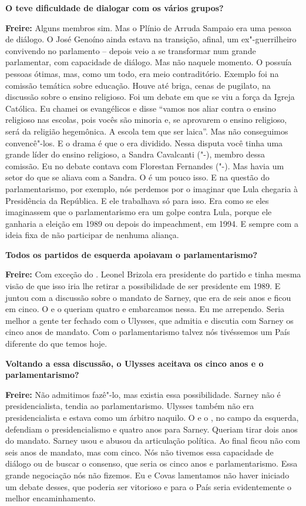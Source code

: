\textbf{O  teve dificuldade de dialogar com os vários grupos?}

\textbf{Freire:} Alguns membros sim. Mas o Plínio de Arruda Sampaio era
uma pessoa de diálogo. O José Genoíno ainda estava na transição, afinal,
um ex"-guerrilheiro convivendo no parlamento -- depois veio a se
transformar num grande parlamentar, com capacidade de diálogo. Mas não
naquele momento. O  possuía pessoas ótimas, mas, como um todo, era
meio contraditório. Exemplo foi na comissão temática sobre educação.
Houve até briga, cenas de pugilato, na discussão sobre o ensino
religioso. Foi um debate em que se viu a força da Igreja Católica. Eu
chamei os evangélicos e disse ``vamos nos aliar contra o ensino
religioso nas escolas, pois vocês são minoria e, se aprovarem o ensino
religioso, será da religião hegemônica. A escola tem que ser laica''.
Mas não conseguimos convencê"-los. E o drama é que o  era dividido.
Nessa disputa você tinha uma grande líder do ensino religioso, a Sandra
Cavalcanti ("-), membro dessa comissão. Eu no debate contava com
Florestan Fernandes ("-). Mas havia um setor do  que se aliava com
a Sandra. O  é um pouco isso. E na questão do parlamentarismo, por
exemplo, nós perdemos por o  imaginar que Lula chegaria à Presidência
da República. E ele trabalhava só para isso. Era como se eles
imaginassem que o parlamentarismo era um golpe contra Lula, porque ele
ganharia a eleição em 1989 ou depois do impeachment, em 1994. E sempre
com a ideia fixa de não participar de nenhuma aliança.

\textbf{Todos os partidos de esquerda apoiavam o parlamentarismo?}

\textbf{Freire:} Com exceção do . Leonel Brizola era presidente do
partido e tinha mesma visão de que isso iria lhe retirar a possibilidade
de ser presidente em 1989. E juntou com a discussão sobre o mandato de
Sarney, que era de seis anos e ficou em cinco. O  e o  queriam
quatro e embarcamos nessa. Eu me arrependo. Seria melhor a gente ter
fechado com o Ulysses, que admitia e discutia com Sarney os cinco anos
de mandato. Com o parlamentarismo talvez nós tivéssemos um País
diferente do que temos hoje.

\textbf{Voltando a essa discussão, o Ulysses aceitava os cinco anos e o
parlamentarismo?}

\textbf{Freire:} Não admitimos fazê"-lo, mas existia essa possibilidade.
Sarney não é presidencialista, tendia ao parlamentarismo. Ulysses também
não era presidencialista e estava como um árbitro naquilo. O  e o ,
no campo da esquerda, defendiam o presidencialismo e quatro anos para
Sarney. Queriam tirar dois anos do mandato. Sarney usou e abusou da
articulação política. Ao final ficou não com seis anos de mandato, mas
com cinco. Nós não tivemos essa capacidade de diálogo ou de buscar o
consenso, que seria os cinco anos e parlamentarismo. Essa grande
negociação nós não fizemos. Eu e Covas lamentamos não haver iniciado um
debate desses, que poderia ser vitorioso e para o País seria
evidentemente o melhor encaminhamento.

